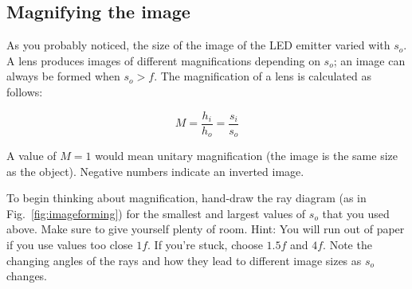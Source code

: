 \documentclass[a4paper]{report}
\newcommand{\nexercise}[0]{\arabic{exercises}\addtocounter{exercises}{1}}
\begin{document}
\subsection{Magnifying the image}
As you probably noticed, the size of the image of the LED emitter varied with $s_o$.
A lens produces images of different magnifications depending on $s_o$; an image can always be formed when $s_o>f$. 
The magnification of a lens is calculated as follows:

\begin{equation}
M = \frac{h_i}{h_o} = \frac{s_i}{s_o}
\label{eq:mag}
\end{equation}

A value of $M=1$ would mean unitary magnification (the image is the same size as the object). 
Negative numbers indicate an inverted image.
\begin{exercisebox}[frametitle={Exercise \nexercise: Magnification}]
To begin thinking about magnification, hand-draw the ray diagram (as in Fig.~\ref{fig:imageforming}) for the smallest and largest values of $s_o$ that you used above. 
Make sure to give yourself plenty of room. 
Hint: You will run out of paper if you use values too close $1f$.
If you're stuck, choose $1.5f$ and $4f$.
Note the changing angles of the rays and how they lead to different image sizes as $s_o$ changes.
\end{exercisebox} 
%
%
%
\end{document}
